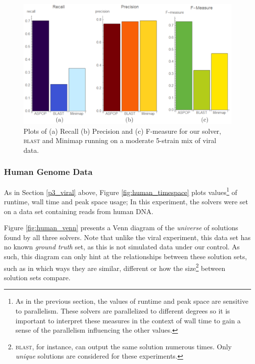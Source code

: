 \begin{figure}
\centering
\includegraphics[width=0.9\linewidth]{images/prec_rec_f_p3.png}
\caption[Recall, precision, and f-measure for our \aspop{} solver, \textsc{blast} and Minimap running on a moderate 5-strain mix of viral data.]{Plots of (a) Recall (b) Precision and (c) F-measure for our \aspop{} solver, \textsc{blast} and Minimap running on a moderate 5-strain mix of viral data.}
\label{fig:prec_rec_f_p3}
\end{figure}




\subsubsection{Human Genome Data}
As in Section \ref{p3_viral} above, Figure \ref{fig:human_timespace} plots values\footnote{As in the previous section, the values of runtime and peak space are sensitive to parallelism. These solvers are parallelized to different degrees so it is important to interpret these measures in the context of wall time to gain a sense of the parallelism influencing the other values.} of runtime, wall time and peak space usage; In this experiment, the solvers were set on a data set containing \glspl{read} from human DNA.

Figure \ref{fig:human_venn} presents a Venn diagram of the \textit{universe} of \glspl{solution} found by all three solvers. Note that unlike the viral experiment, this data set has no known \textit{ground truth} set, as this is not simulated data under our control. As such, this diagram can only hint at the relationships between these solution sets, such as in which ways they are similar, different or how the size\footnote{\textsc{blast}, for instance, can output the same solution numerous times. Only \textit{unique} solutions are considered for these experiments.} between solution sets compare.




